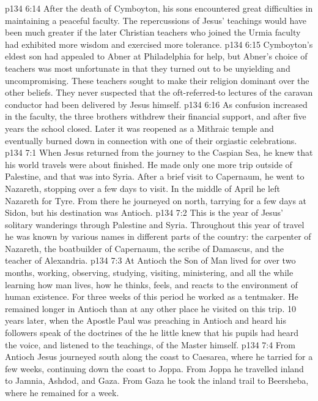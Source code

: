 \separatorshort
\vs p134 6:14 After the death of Cymboyton, his sons encountered great difficulties in maintaining a peaceful faculty. The repercussions of Jesus’ teachings would have been much greater if the later Christian teachers who joined the Urmia faculty had exhibited more wisdom and exercised more tolerance.
\vs p134 6:15 Cymboyton’s eldest son had appealed to Abner at Philadelphia for help, but Abner’s choice of teachers was most unfortunate in that they turned out to be unyielding and uncompromising. These teachers sought to make their religion dominant over the other beliefs. They never suspected that the oft\hyp{}referred\hyp{}to lectures of the caravan conductor had been delivered by Jesus himself.
\vs p134 6:16 As confusion increased in the faculty, the three brothers withdrew their financial support, and after five years the school closed. Later it was reopened as a Mithraic temple and eventually burned down in connection with one of their orgiastic celebrations.
\vs p134 7:1 When Jesus returned from the journey to the Caspian Sea, he knew that his world travels were about finished. He made only one more trip outside of Palestine, and that was into Syria. After a brief visit to Capernaum, he went to Nazareth, stopping over a few days to visit. In the middle of April he left Nazareth for Tyre. From there he journeyed on north, tarrying for a few days at Sidon, but his destination was Antioch.
\vs p134 7:2 This is the year of Jesus’ solitary wanderings through Palestine and Syria. Throughout this year of travel he was known by various names in different parts of the country: the carpenter of Nazareth, the boatbuilder of Capernaum, the scribe of Damascus, and the teacher of Alexandria.
\vs p134 7:3 At Antioch the Son of Man lived for over two months, working, observing, studying, visiting, ministering, and all the while learning how man lives, how he thinks, feels, and reacts to the environment of human existence. For three weeks of this period he worked as a tentmaker. He remained longer in Antioch than at any other place he visited on this trip. 10 years later, when the Apostle Paul was preaching in Antioch and heard his followers speak of the doctrines of the  he little knew that his pupils had heard the voice, and listened to the teachings, of the Master himself.
\vs p134 7:4 From Antioch Jesus journeyed south along the coast to Caesarea, where he tarried for a few weeks, continuing down the coast to Joppa. From Joppa he travelled inland to Jamnia, Ashdod, and Gaza. From Gaza he took the inland trail to Beersheba, where he remained for a week.
